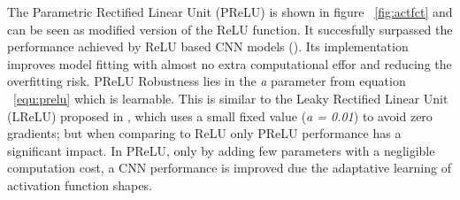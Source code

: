 The Parametric Rectified Linear Unit (PReLU) is shown in figure ~\ref{fig:actfct} and can be seen as modified version of the ReLU function. It succesfully surpassed the performance achieved by  ReLU based CNN models (\textcite{he2015delving}). Its implementation improves model fitting with almost no extra computational effor and reducing the overfitting risk. PReLU Robustness lies in the \textit{a} parameter from equation ~\ref{equ:prelu} which is learnable. This is similar to the Leaky Rectified Linear Unit (LReLU) proposed in \textcite{maas2013}, which uses a small fixed value (\textit{a =  0.01}) to avoid zero gradients; but when comparing to ReLU only PReLU performance has a significant impact. In PReLU, only by adding few parameters with a negligible computation cost, a CNN performance is improved due the adaptative learning of activation function shapes.  






